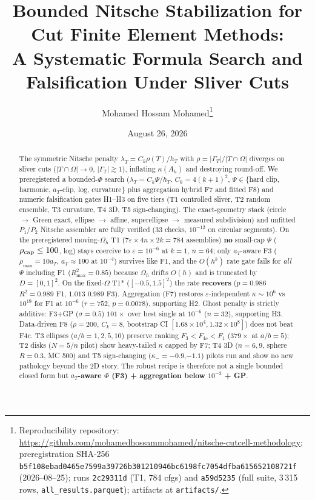 \documentclass[11pt]{article}
\title{Bounded Nitsche Stabilization for Cut Finite Element Methods:\\
A Systematic Formula Search and Falsification Under Sliver Cuts}
\author{Mohamed Hossam Mohamed\thanks{Reproducibility repository:
\url{https://github.com/mohamedhossammohamed/nitsche-cutcell-methodology};
preregistration SHA-256 \texttt{b5f108ebad0465e7599a39726b301210946bc6198fc7054dfba615652108721f}
(2026--08--25); runs \texttt{2c29311d} (T1, 784 cfgs) and \texttt{a59d5235} (full suite, 3\,315 rows, \texttt{all\_results.parquet}); artifacts at \texttt{artifacts/}.}}
\date{August 26, 2026}
\theoremstyle{definition}
\begin{document}
\maketitle

\begin{abstract}
The symmetric Nitsche penalty $\lambda_T=C_k\rho(T)/h_T$ with
$\rho=|\Gamma_T|/|T\cap\Omega|$ diverges on sliver cuts
($|T\cap\Omega|\to0$, $|\Gamma_T|\gtrsim1$), inflating $\kappa(A_h)$ and
destroying round-off. We preregistered a bounded-$\Phi$ search
($\lambda_T=C_k\Psi/h_T$, $C_k=4(k+1)^2$, $\Psi\in\{$hard clip, harmonic,
$a_T$-clip, log, curvature$\}$ plus aggregation hybrid F7 and fitted F8) and
numeric falsification gates H1--H3 on five tiers (T1 controlled sliver,
T2 random ensemble, T3 curvature, T4 3D, T5 sign-changing). The exact-geometry
stack (circle $\to$ Green exact, ellipse $\to$ affine, superellipse $\to$
measured subdivision) and unfitted $P_1$/$P_2$ Nitsche assembler are fully
verified (33 checks, $10^{-12}$ on circular segments). On the preregistered
moving-$\Omega_h$ T1 ($7\varepsilon\times4n\times2k=784$ assemblies) \textbf{no}
small-cap $\Psi$ ($\rho_{\rm cap}\le100$, log) stays coercive to
$\varepsilon=10^{-6}$ at $k=1$, $n=64$; only $a_T$-aware F3
($\rho_{\max}=10a_T$, $a_T\approx190$ at $10^{-4}$) survives like F1, and the
$O(h^k)$ rate gate fails for \emph{all} $\Psi$ including F1 ($R^2_{\max}=0.85$)
because $\Omega_h$ drifts $O(h)$ and is truncated by $D=[0,1]^2$. On the
fixed-$\Omega$ T1* ($[-0.5,1.5]^2$) the rate \textbf{recovers}
($p=0.986$ $R^2=0.989$ F1, $1.013$ $0.989$ F3). Aggregation (F7) restores
$\varepsilon$-independent $\kappa\sim10^6$ vs $10^{19}$ for F1 at $10^{-6}$
($r=752$, $p=0.0078$), supporting H2. Ghost penalty is strictly additive:
F3+GP ($\sigma=0.5$) $101\times$ over best single at $10^{-6}$ ($n=32$),
supporting H3. Data-driven F8 ($\rho=200$, $C_k=8$, bootstrap CI
$[1.68\times10^{4},1.32\times10^{8}]$) does not beat F4c. T3 ellipses
($a/b=1,2,5,10$) preserve ranking $F_3<F_{4c}<F_1$ ($379\times$ at $a/b=5$);
T2 disks ($N=5$/$n$ pilot) show heavy-tailed $\kappa$ capped by F7; T4 3D
($n=6,9$, sphere $R=0.3$, MC 500) and T5 sign-changing ($\kappa_-=-0.9$,$-1.1$)
pilots run and show no new pathology beyond the 2D story. The robust recipe
is therefore not a single bounded closed form but \textbf{$a_T$-aware $\Phi$
(F3) + aggregation below $10^{-3}$ + GP}.
\end{abstract}
\end{document}
